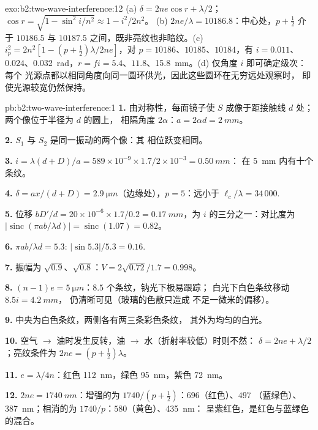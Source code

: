 \begin{solution}{exo:b2:two-wave-interference:12}
(a) $\delta = 2ne\cos r + \lambda/2$；$\cos r = \sqrt{1 - \sin^2i/n^2} \approx 1 - i^2/2n^2$。
(b) $2ne/\lambda = 10186.8$：中心处，$p + \tfrac12$ 介于 $10186.5$ 与
$10187.5$ 之间，既非亮纹也非暗纹。(c) $i_p^2 = 2n^2[1 - (p + \tfrac12)\lambda/
2ne]$，对 $p = 10186$、$10185$、$10184$，有 $i = 0.011$、$0.024$、\qty{0.032}{rad}，$r = fi
= 5.4$、$11.8$、\qty{15.8}{mm}。(d) 仅角度 $i$ 即可确定级次：每个
光源点都以相同角度向同一圆环供光，因此这些圆环在无穷远处观察时，
即使光源较宽仍然保持。
\end{solution}

\begin{solution}{pb:b2:two-wave-interference:1}
\textbf{1.} 由对称性，每面镜子使 $S$ 成像于距接触线 $d$
处；两个像位于半径为 $d$ 的圆上，
相隔角度 $2\alpha$：$a = 2\alpha d = \qty{2}{mm}$。

\textbf{2.} $S_1$ 与 $S_2$ 是同一振动的两个像：其
相位跃变相同。

\textbf{3.} $i = \lambda(d + D)/a = 589 \times 10^{-9} \times 1.7/2 \times 10^{-3} = \qty{0.50}{mm}$：
在 \qty{5}{mm} 内有十个条纹。

\textbf{4.} $\delta = ax/(d + D) = \qty{2.9}{\micro m}$（边缘处），$p = 5$：远小于
$\ell_c/\lambda = 34\,000$.

\textbf{5.} 位移 $bD'/d = 20 \times 10^{-6} \times 1.7/0.2 = \qty{0.17}{mm}$，为
$i$ 的三分之一：对比度为 $|\operatorname{sinc}(\pi ab/\lambda d)| = \operatorname{sinc}(1.07) = 0.82$。

\textbf{6.} $\pi ab/\lambda d = 5.3$: $|\sin5.3|/5.3 = 0.16$.

\textbf{7.} 振幅为 $\sqrt{0.9}$、$\sqrt{0.8}$：$V = 2\sqrt{0.72}/1.7 = 0.998$。

\textbf{8.} $(n - 1)e = \qty{5}{\micro m}$：$8.5$ 个条纹，钠光下极易跟踪；
白光下白色条纹移动 $8.5i = \qty{4.2}{mm}$，
仍清晰可见（玻璃的色散只造成
不足一微米的偏移）。

\textbf{9.} 中央为白色条纹，两侧各有两三条彩色条纹，
其外为均匀的白光。

\textbf{10.} 空气 $\to$ 油时发生反转，油 $\to$ 水（折射率较低）时则不然：
$\delta = 2ne + \lambda/2$；亮纹条件为 $2ne = (p + \tfrac12)\lambda$。

\textbf{11.} $e = \lambda/4n$：红色 \qty{112}{nm}，绿色 \qty{95}{nm}，紫色 \qty{72}{nm}。

\textbf{12.} $2ne = \qty{1740}{nm}$：增强的为 $1740/(p + \tfrac12)$：$696$（红色）、$497$
（蓝绿色）、\qty{387}{nm}；相消的为 $1740/p$：$580$（黄色）、\qty{435}{nm}：
呈紫红色，是红色与蓝绿色的混合。


\end{solution}

